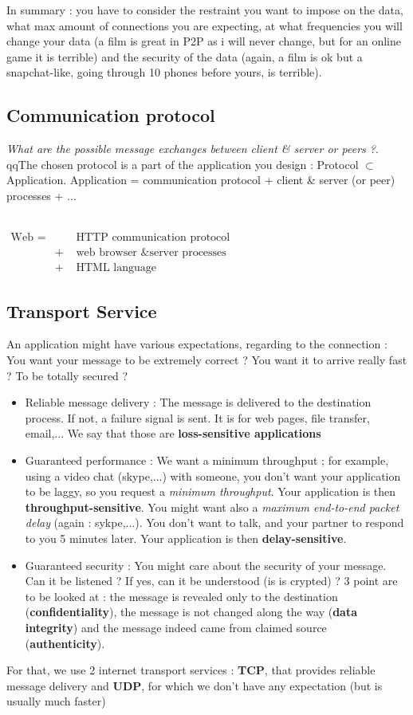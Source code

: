 \documentclass[12pt,a4paper]{article}
\begin{document}
In summary : you have to consider the restraint you want to impose on the data, what max amount of connections you are expecting, at what frequencies you will change your data (a film is great in P2P as i will never change, but for an online game it is terrible) and the security of the data (again, a film is ok but a snapchat-like, going through 10 phones before yours, is terrible).

\subsection{Communication protocol}
\textit{What are the possible message exchanges between client \&  server or peers ?}.  qqThe chosen protocol is a part of the application you design : Protocol $\subset$ Application. Application = communication protocol + client \& server (or peer) processes + ...
\begin{exemple}~\\
	$\begin{array}{lcl}
	\text{Web } = & &  \text{ HTTP communication protocol} \\ 
	& + &\text{ web browser \& server processes} \\ & + &\text{ HTML language}
	\end{array}$
\end{exemple}

\subsection{Transport Service}
An application might have various expectations, regarding to the connection : You want your message to be extremely correct ? You want it to arrive really fast ? To be totally secured ? 
\begin{itemize}
	\item 	Reliable message delivery : The message is delivered to the destination process. If not, a failure signal is sent. It is for web pages, file transfer, email,... We say that those are \textbf{loss-sensitive applications}
	\item 	Guaranteed performance : We want a minimum throughput ; for example, using a video chat (skype,...) with someone, you don't want your application to be laggy, so you request a \textit{minimum throughput}. Your application is then \textbf{throughput-sensitive}. You might want also a \textit{maximum end-to-end packet delay} (again : sykpe,...). You don't want to talk, and your partner to respond to you 5 minutes later. Your application is then \textbf{delay-sensitive}.
	\item 	Guaranteed security : You might care about the security of your message. Can it be listened ? If yes, can it be understood (is is crypted) ? 3 point are to be looked at : the message is revealed only to the destination (\textbf{confidentiality}), the message is not changed along the way (\textbf{data integrity}) and the message indeed came from claimed source (\textbf{authenticity}).
\end{itemize}
For that, we use 2 internet transport services : \textbf{TCP}, that provides reliable message delivery and \textbf{UDP}, for which we don't have any expectation (but is usually much faster)
\end{document}
